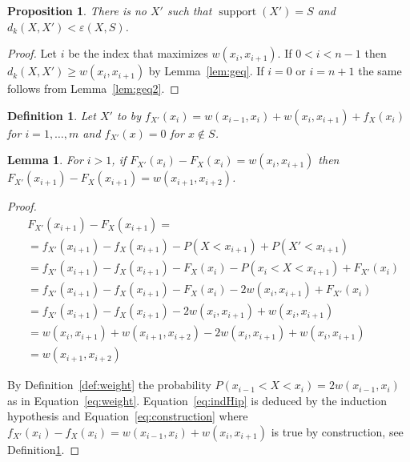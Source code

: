 \documentclass{article}
\newtheorem{lemma}[thm]{Lemma}
\newtheorem{definition}[thm]{Definition}
\newtheorem{proposition}[thm]{Proposition}
\DeclareMathOperator{\support}{support}
\begin{document}
\begin{proposition}
	There is no $X'$ such that $\support(X')=S$ and $d_k(X,X') < \varepsilon(X,S)$.
\end{proposition}
\begin{proof}
	Let $i$ be the index that maximizes $w(x_{i}, x_{i+1})$. If $0<i<n-1$ then $d_k(X,X') \geq w(x_{i}, x_{i+1})$ by Lemma~\ref{lem:geq}. If $i=0$ or $i=n+1$ the same follows from Lemma~\ref{lem:geq2}.
\end{proof}

\begin{definition}\label{def:construction}
Let $X'$ to by $f_{X'}(x_{i}) = w(x_{i-1},x_i) + w(x_i,x_{i+1}) + f_{X}(x_i)$ for $i=1,\dots,m$ and $f_{X'}(x)=0$ for $x \notin S$.
\end{definition}

\begin{lemma}
	For $i>1$, if $F_{X'}(x_{i})-F_{X}(x_{i}) = w(x_{i}, x_{i+1})$ then $F_{X'}(x_{i+1})-F_{X}(x_{i+1}) = w(x_{i+1}, x_{i+2})$.
\end{lemma}
\begin{proof}
	\begin{align}
	&F_{X'}(x_{i+1})-F_{X}(x_{i+1}) = \\ \nonumber
	& = f_{X'}(x_{i+1}) - f_{X}(x_{i+1}) - P(X<x_{i+1}) + P(X'<x_{i+1})  \\ \nonumber
	& = f_{X'}(x_{i+1}) - f_{X}(x_{i+1}) - F_X(x_{i}) - P(x_{i}< X < x_{i+1}) + F_{X'}(x_{i}) \\ 
	\label{eq:weight}
	& = f_{X'}(x_{i+1}) - f_{X}(x_{i+1}) - F_X(x_{i}) - 2w(x_{i},x_{i+1}) + F_{X'}(x_{i})  \\ \label{eq:indHip}
	& = f_{X'}(x_{i+1}) - f_{X}(x_{i+1}) - 2w(x_{i},x_{i+1}) +w(x_{i}, x_{i+1})  \\ \label{eq:construction}
	& = w(x_{i},x_{i+1}) +w(x_{i+1},x_{i+2}) - 2w(x_{i},x_{i+1}) +w(x_{i}, x_{i+1}) \\ \nonumber
	& = w(x_{i+1},x_{i+2}) \nonumber
	\end{align}
	
	By Definition~\ref{def:weight} the probability $P(x_{i-1}< X < x_i) = 2w(x_{i-1},x_{i})$ as in Equation~\eqref{eq:weight}. Equation~\eqref{eq:indHip} is deduced by the induction hypothesis and Equation~\eqref{eq:construction} where
	$f_{X'}(x_i) - f_{X}(x_i) = w(x_{i-1},x_i) + w(x_i,x_{i+1})$ is true by construction, see Definition\ref{def:construction}.
\end{proof}
\end{document}
